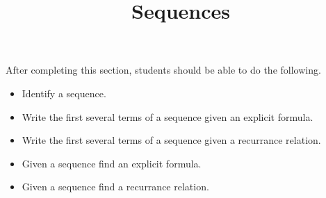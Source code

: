 \documentclass{ximera}
\title{Sequences}
\begin{document}
\begin{abstract}
\end{abstract}

\maketitle

\begin{sectionOutcomes}

After completing this section, students should be able to do the following.

\begin{itemize}
\item Identify a sequence.
\item Write the first several terms of a sequence given an explicit formula.
\item Write the first several terms of a sequence given a recurrance
  relation.
\item Given a sequence find an explicit formula.
\item Given a sequence find a recurrance relation.
\end{itemize}

\end{sectionOutcomes}
\end{document}
